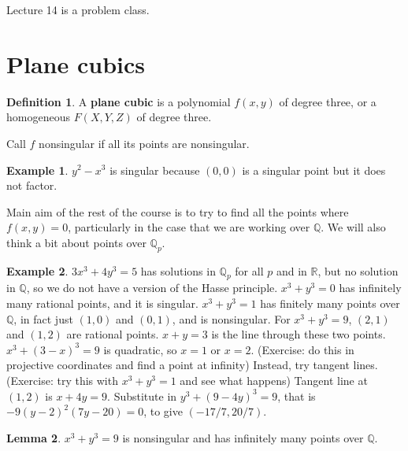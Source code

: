 \documentclass{article}
\newcommand{\Q}{\mathbb{Q}}
\newcommand{\R}{\mathbb{R}}
\newcommand{\rb}[1]{\left( #1 \right)}
\theoremstyle{definition}\newtheorem{definition}{Definition}[section]
\theoremstyle{definition}\newtheorem{remark}[definition]{Remark}
\theoremstyle{definition}\newtheorem*{example}{Example}
\theoremstyle{definition}\newtheorem*{note}{Note}
\newtheorem{lemma}[definition]{Lemma}
\begin{document}

Lecture 14 is a problem class.


\section{Plane cubics}

\begin{definition}
A \textbf{plane cubic} is a polynomial $ f\rb{x, y} $ of degree three, or a homogeneous $ F\rb{X, Y, Z} $ of degree three.
\end{definition}

Call $ f $ nonsingular if all its points are nonsingular.

\begin{example}
$ y^2 - x^3 $ is singular because $ \rb{0, 0} $ is a singular point but it does not factor.
\end{example}

Main aim of the rest of the course is to try to find all the points where $ f\rb{x, y} = 0 $, particularly in the case that we are working over $ \Q $. We will also think a bit about points over $ \Q_p $.

\begin{example}
$ 3x^3 + 4y^3 = 5 $ has solutions in $ \Q_p $ for all $ p $ and in $ \R $, but no solution in $ \Q $, so we do not have a version of the Hasse principle. $ x^3 + y^3 = 0 $ has infinitely many rational points, and it is singular. $ x^3 + y^3 = 1 $ has finitely many points over $ \Q $, in fact just $ \rb{1, 0} $ and $ \rb{0, 1} $, and is nonsingular. For $ x^3 + y^3 = 9 $, $ \rb{2, 1} $ and $ \rb{1, 2} $ are rational points. $ x + y = 3 $ is the line through these two points. $ x^3 + \rb{3 - x}^3 = 9 $ is quadratic, so $ x = 1 $ or $ x = 2 $. (Exercise: do this in projective coordinates and find a point at infinity) Instead, try tangent lines. (Exercise: try this with $ x^3 + y^3 = 1 $ and see what happens) Tangent line at $ \rb{1, 2} $ is $ x + 4y = 9 $. Substitute in $ y^3 + \rb{9 - 4y}^3 = 9 $, that is $ -9\rb{y - 2}^2\rb{7y - 20} = 0 $, to give $ \rb{-17 / 7, 20 / 7} $.
\end{example}

\begin{lemma}
$ x^3 + y^3 = 9 $ is nonsingular and has infinitely many points over $ \Q $.
\end{lemma}
\end{document}
